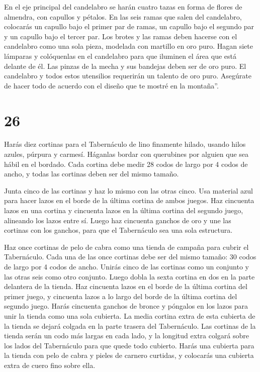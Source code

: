  En el eje principal del candelabro se harán cuatro tazas
en forma de flores de almendra, con capullos y pétalos.  En
las seis ramas que salen del candelabro, colocarás un capullo bajo el
primer par de ramas, un capullo bajo el segundo par y un capullo bajo el
tercer par.  Los brotes y las ramas deben hacerse con el
candelabro como una sola pieza, modelada con martillo en oro puro.
 Hagan siete lámparas y colóquenlas en el candelabro para
que iluminen el área que está delante de él.  Las pinzas de
la mecha y sus bandejas deben ser de oro puro.  El
candelabro y todos estos utensilios requerirán un talento de oro puro.
 Asegúrate de hacer todo de acuerdo con el diseño que te
mostré en la montaña''.

\hypertarget{section-25}{%
\section{26}\label{section-25}}

 Harás diez cortinas para el Tabernáculo de lino finamente
hilado, usando hilos azules, púrpura y carmesí. Háganlas bordar con
querubines por alguien que sea hábil en el bordado.  Cada
cortina debe medir 28 codos de largo por 4 codos de ancho, y todas las
cortinas deben ser del mismo tamaño.

 Junta cinco de las cortinas y haz lo mismo con las otras
cinco.  Usa material azul para hacer lazos en el borde de la
última cortina de ambos juegos.  Haz cincuenta lazos en una
cortina y cincuenta lazos en la última cortina del segundo juego,
alineando los lazos entre sí.  Luego haz cincuenta ganchos
de oro y une las cortinas con los ganchos, para que el Tabernáculo sea
una sola estructura.

 Haz once cortinas de pelo de cabra como una tienda de
campaña para cubrir el Tabernáculo.  Cada una de las once
cortinas debe ser del mismo tamaño: 30 codos de largo por 4 codos de
ancho.  Unirás cinco de las cortinas como un conjunto y las
otras seis como otro conjunto. Luego dobla la sexta cortina en dos en la
parte delantera de la tienda.  Haz cincuenta lazos en el
borde de la última cortina del primer juego, y cincuenta lazos a lo
largo del borde de la última cortina del segundo juego. 
Harás cincuenta ganchos de bronce y póngalos en los lazos para unir la
tienda como una sola cubierta.  La media cortina extra de
esta cubierta de la tienda se dejará colgada en la parte trasera del
Tabernáculo.  Las cortinas de la tienda serán un codo más
largas en cada lado, y la longitud extra colgará sobre los lados del
Tabernáculo para que quede todo cubierto.  Harás una
cubierta para la tienda con pelo de cabra y pieles de carnero curtidas,
y colocarás una cubierta extra de cuero fino sobre ella.

